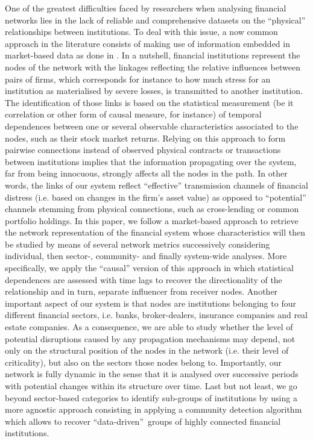 \documentclass[a4paper,10pt]{article}
\begin{document}
One of the greatest difficulties faced by researchers when analysing financial networks lies in the lack of reliable and 
comprehensive datasets on the “physical” relationships between institutions. To deal with this issue, a now common approach in
the literature consists of making use of information embedded in market-based data as done in \cite{Billio,Diebold}. In a
nutshell, financial institutions represent the nodes of the network with the linkages reflecting the relative influences
between pairs of firms, which corresponds for instance to how much stress for an institution as materialised by severe losses, 
is transmitted to another institution. The identification of those links is based on the statistical measurement (be it 
correlation or other form of causal measure, for instance) of temporal dependences between one or several observable 
characteristics associated to the nodes, such as their stock market returns. Relying on this approach to form pairwise 
connections instead of observed physical contracts or transactions between institutions implies that the information 
propagating over the system, far from being innocuous, strongly affects all the nodes in the path. In other words, the links 
of our system reflect “effective” transmission channels of financial distress (i.e. based on changes in the firm’s asset 
value) as opposed to “potential” channels stemming from physical connections, such as cross-lending or common portfolio 
holdings. In this paper, we follow a market-based approach to retrieve the network representation of the financial system 
whose characteristics will then be studied by means of several network metrics successively considering individual, then 
sector-, community- and finally system-wide analyses. More specifically, we apply the “causal” version of this approach in 
which statistical dependences are assessed with time lags to recover the directionality of the relationship and in turn, 
separate influencer from receiver nodes. Another important aspect of our system is that nodes are institutions belonging to 
four different financial sectors, i.e. banks, broker-dealers, insurance companies and real estate companies. As a consequence,
we are able to study whether the level of potential disruptions caused by any propagation mechanisms may depend, not only on 
the structural position of the nodes in the network (i.e. their level of criticality), but also on the sectors those nodes 
belong to.  Importantly, our network is fully dynamic in the sense that it is analysed over
successive periods with potential changes within its structure over time. Last but not least, we go beyond sector-based categories to identify sub-groups of institutions by using a more agnostic approach consisting in applying a community detection algorithm which allows to recover \textquotedblleft data-driven\textquotedblright\  groups of highly connected financial institutions.  
\end{document}
